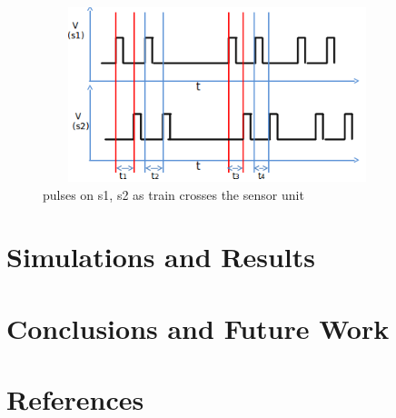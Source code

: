 \documentclass[titlepage]{article}
\begin{document}
\begin{figure}[H]
\begin{center}
\includegraphics[height = 2in,width=4in,angle=00]{figures/8w_no_miss.png}
\caption{\small pulses on s1, s2 as train crosses the sensor unit}
\end{center}
\end{figure}


\section{Simulations and Results}

\section{Conclusions and Future Work}

\section{References}
\end{document}
